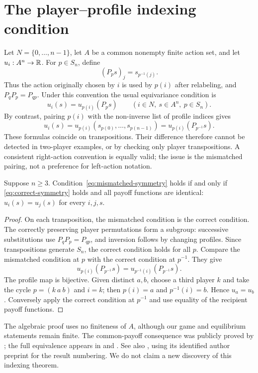 \section{The player--profile indexing condition}\label{sec:indexing}
Let $N=\{0,\ldots,n-1\}$, let $A$ be a common nonempty finite action set,
and let $u_i:A^n\to\mathbb R$. For $p\in S_n$, define
\begin{equation}\label{eq:profile-action}
 (P_p s)_j=s_{p^{-1}(j)}.
\end{equation}
Thus the action originally chosen by $i$ is used by $p(i)$ after relabeling,
and $P_qP_p=P_{qp}$. Under this convention the usual equivariance condition is
\begin{equation}\label{eq:correct-symmetry}
 u_i(s)=u_{p(i)}(P_p s)\qquad(i\in N,\ s\in A^n,\ p\in S_n).
\end{equation}
By contrast, pairing $p(i)$ with the non-inverse list of profile indices gives
\begin{equation}\label{eq:mismatched-symmetry}
 u_i(s)=u_{p(i)}(s_{p(0)},\ldots,s_{p(n-1)})
       =u_{p(i)}(P_{p^{-1}}s).
\end{equation}
These formulas coincide on transpositions. Their difference therefore cannot
be detected in two-player examples, or by checking only player transpositions.
A consistent right-action convention is equally valid; the issue is the
mismatched pairing, not a preference for left-action notation.

\begin{theorem}\label{thm:indexing}
Suppose $n\ge3$. Condition~\eqref{eq:mismatched-symmetry} holds if and only if
\eqref{eq:correct-symmetry} holds and all payoff functions are identical:
$u_i(s)=u_j(s)$ for every $i,j,s$.
\end{theorem}
\begin{proof}
On each transposition, the mismatched condition is the correct condition.
The correctly preserving player permutations form a subgroup: successive
substitutions use $P_qP_p=P_{qp}$, and inversion follows by changing profiles.
Since transpositions generate $S_n$, the correct condition holds for all $p$.
Compare the mismatched condition at $p$ with the correct condition at $p^{-1}$.
They give
\[
 u_{p(i)}(P_{p^{-1}}s)=u_{p^{-1}(i)}(P_{p^{-1}}s).
\]
The profile map is bijective. Given distinct $a,b$, choose a third player $k$
and take the cycle $p=(k\ a\ b)$ and $i=k$; then $p(i)=a$ and $p^{-1}(i)=b$.
Hence $u_a=u_b$. Conversely apply the correct condition at $p^{-1}$ and
use equality of the recipient payoff functions.
\end{proof}
The algebraic proof uses no finiteness of $A$, although our game and equilibrium
statements remain finite. The common-payoff consequence was publicly proved
by \citet[Appendix B, Theorem 32]{vester2012}; the full equivalence appears in
\citet[Theorem 3.18]{ham2013} and \citet[Theorem 3.21]{ham2021}. See also
\citet[Lemma 2.14 and Proposition 2.15]{tohme2019}, using its identified author
preprint for the result numbering. We do not claim a new discovery of this
indexing theorem.

